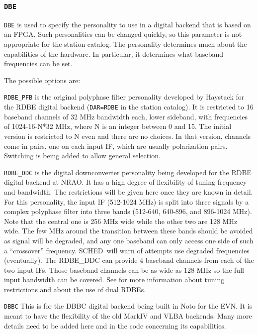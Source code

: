 \documentclass{report}
\newcommand{\schedb}{{\sc SCHED~}}
\begin{document}
\subsubsection{\label{SP:DBE}{\tt DBE}}

{\tt DBE} is used to specify the personality to use in a digital
backend that is based on an FPGA.  Such personalities can be changed
quickly, so this parameter is not appropriate for the station catalog.
The personality determines much about the capabilities of the hardware.
In particular, it determines what baseband frequencies can be set.

The possible options are:

\begin{description}

\item {\tt RDBE\_PFB} is the original polyphase filter personality
developed by Haystack for the RDBE digital backend ({\tt DAR=RDBE} in
the station catalog).  It is restricted to 16 baseband channels of 32
MHz bandwidth each, lower sideband, with frequencies of 1024-16-N*32
MHz, where N is an integer between 0 and 15.  The initial version is
restricted to N even and there are no choices.  In that version,
channels come in pairs, one on each input IF, which are usually
polarization pairs.  Switching is being added to allow general
selection.

\item {\tt RDBE\_DDC} is the digital downconverter personality being
developed for the RDBE digital backend at NRAO.  It has a high degree
of flexibility of tuning frequency and bandwidth.  The restrictions
will be given here once they are known in detail.  For this personality,
the input IF (512-1024 MHz) is split into three signals by a complex
polyphase filter into three bands (512-640, 640-896, and 896-1024 MHz).
Note that the central one is 256 MHz wide while the other two are 128
MHz wide.  The few MHz around the transition between these bands should
be avoided as signal will be degraded, and any one baseband can only
access one side of such a ``crossover'' frequency.  \schedb will warn
of attempts use degraded frequencies (eventually).  The RDBE\_DDC can
provide 4 baseband channels from each of the two input IFs.  Those
baseband channels can be as wide as 128 MHz so the full input bandwidth
can be covered.  See 
for more information about tuning restrictions and about the use of
dual RDBEs.

\item {\tt DBBC} This is for the DBBC digital backend being built in
Noto for the EVN.  It is meant to have the flexibility of the old
MarkIV and VLBA backends.  Many more details need to be added here and
in the code concerning its capabilities.

\end{description}
\end{document}
